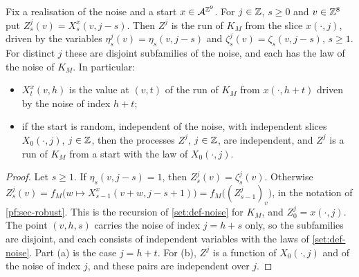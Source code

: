 \begin{lemma}[Characteristics]\label{pf:characteristics}
Fix a realisation of the noise and a start $x\in\mathcal{A}^{\mathbb{Z}^9}$. For $j\in\mathbb{Z}$, $s\ge0$ and $v\in\mathbb{Z}^8$ put $Z^j_s(v)=X^x_s(v,j-s)$. Then $Z^j$ is the run of $K_M$ from the slice $x(\cdot,j)$, driven by the variables $\eta^j_s(v)=\eta_s(v,j-s)$ and $\zeta^j_s(v)=\zeta_s(v,j-s)$, $s\ge1$. For distinct $j$ these are disjoint subfamilies of the noise, and each has the law of the noise of $K_M$. In particular:
\begin{itemize}
\item[(a)] $X^x_t(v,h)$ is the value at $(v,t)$ of the run of $K_M$ from $x(\cdot,h+t)$ driven by the noise of index $h+t$;
\item[(b)] if the start is random, independent of the noise, with independent slices $X_0(\cdot,j)$, $j\in\mathbb{Z}$, then the processes $Z^j$, $j\in\mathbb{Z}$, are independent, and $Z^j$ is a run of $K_M$ from a start with the law of $X_0(\cdot,j)$.
\end{itemize}
\end{lemma}

\begin{proof}
Let $s\ge1$. If $\eta_s(v,j-s)=1$, then $Z^j_s(v)=\zeta^j_s(v)$. Otherwise $Z^j_s(v)=f_M\bigl(w\mapsto X^x_{s-1}(v+w,j-s+1)\bigr)=f_M\bigl((Z^j_{s-1})_v\bigr)$, in the notation of \cref{pf:sec-robust}. This is the recursion of \cref{set:def-noise} for $K_M$, and $Z^j_0=x(\cdot,j)$. The point $(v,h,s)$ carries the noise of index $j=h+s$ only, so the subfamilies are disjoint, and each consists of independent variables with the laws of \cref{set:def-noise}. Part (a) is the case $j=h+t$. For (b), $Z^j$ is a function of $X_0(\cdot,j)$ and of the noise of index $j$, and these pairs are independent over $j$.
\end{proof}

